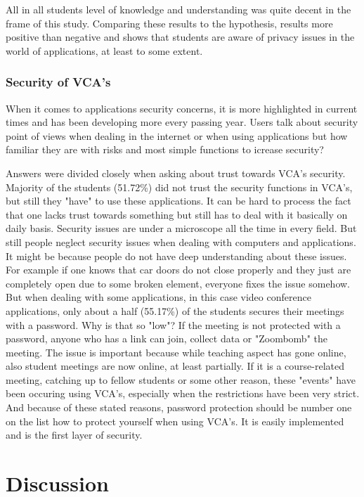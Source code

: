 \documentclass[utf8,english]{gradu3}
\begin{document}
All in all students level of knowledge and understanding was quite decent in the frame of this study. Comparing these results to the hypothesis, results more positive than negative and shows that students are aware of privacy issues in the world of applications, at least to some extent. 


\subsection{Security of VCA's}
When it comes to applications security concerns, it is more highlighted in current times and has been developing more every passing year. Users talk about security point of views when dealing in the internet or when using applications but how familiar they are with risks and most simple functions to icrease security?

Answers were divided closely when asking about trust towards VCA's security. Majority of the students (51.72\%) did not trust the security functions in VCA's, but still they "have" to use these applications. It can be hard to process the fact that one lacks trust towards something but still has to deal with it basically on daily basis. Security issues are under a microscope all the time in every field. But still people neglect security issues when dealing with computers and applications. It might be because people do not have deep understanding about these issues. For example if one knows that car doors do not close properly and they just are completely open due to some broken element, everyone fixes the issue somehow. But when dealing with some applications, in this case video conference applications, only about a half (55.17\%) of the students secures their meetings with a password. Why is that so "low"? If the meeting is not protected with a password, anyone who has a link can join, collect data or "Zoombomb" the meeting. The issue is important because while teaching aspect has gone online, also student meetings are now online, at least partially. If it is a course-related meeting, catching up to fellow students or some other reason, these "events" have been occuring using VCA's, especially when the restrictions have been very strict. And because of these stated reasons, password protection should be number one on the list how to protect yourself when using VCA's. It is easily implemented and is the first layer of security.




\chapter{Discussion}
\label{discussion}
\end{document}

